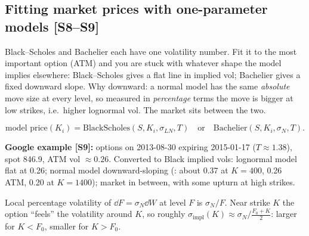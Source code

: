 \documentclass[10pt]{article}
\begin{document}
\subsection{Fitting market prices with one-parameter models [S8--S9]}
\begin{idea}
Black--Scholes and Bachelier each have one volatility number. Fit it to the most important option (ATM) and you are stuck with whatever shape the model implies elsewhere: Black--Scholes gives a flat line in implied vol; Bachelier gives a fixed downward slope. Why downward: a normal model has the same \emph{absolute} move size at every level, so measured in \emph{percentage} terms the move is bigger at low strikes, i.e.\ higher lognormal vol. The market sits between the two.
\end{idea}
\[\text{model price}(K_i)=\mathrm{BlackScholes}(S,K_i,\sigma_{LN},T)\quad\text{or}\quad\mathrm{Bachelier}(S,K_i,\sigma_N,T).\]
\begin{where}
\end{where}
\textbf{Google example [S9]:} options on 2013-08-30 expiring 2015-01-17 ($T\approx1.38$), spot 846.9, ATM vol $\approx0.26$. Converted to Black implied vols: lognormal model flat at 0.26; normal model downward-sloping (\beyond: about 0.37 at $K=400$, 0.26 ATM, 0.20 at $K=1400$); market in between, with some upturn at high strikes.
\begin{deriv}
Local percentage volatility of $\dd F=\sigma_N\dd W$ at level $F$ is $\sigma_N/F$. Near strike $K$ the option ``feels'' the volatility around $K$, so roughly $\sigma_{\text{impl}}(K)\approx\sigma_N/\frac{F_0+K}{2}$: larger for $K<F_0$, smaller for $K>F_0$.
\end{deriv}
\end{document}
